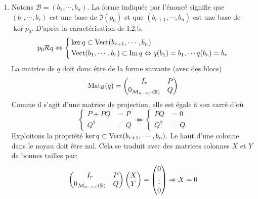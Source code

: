\begin{enumerate}
  \item Notons $\mathcal{B}=(b_1,\cdots,b_n)$. La forme indiquée par l'énoncé signifie que $(b_1,\cdots,b_r)$ est une base de $\Im(p_0)$ et que $(b_{r+1},\cdots, b_n)$ est une base de $\ker p_0$. D'après la caractérisation de I.2.b.
\begin{displaymath}
p_0 \mathcal{R} q \Leftrightarrow
\left\lbrace 
\begin{aligned}
  &\ker q \subset \operatorname{Vect}(b_{r+1},\cdots,b_n)\\ 
  &\operatorname{Vect}(b_1,\cdots,b_r) \subset \operatorname{Im} q \Leftrightarrow q(b_1)=b_1,\cdots q(b_r)=b_r
\end{aligned}
\right. 
\end{displaymath}
La matrice de $q$ doit donc être de la forme suivante (avec des blocs)
\begin{displaymath}
\operatorname{Mat}_{\mathcal{B}}(q)=
\begin{pmatrix}
  I_r & P \\ 0_{\mathcal{M}_{n-r,r}(\mathbb{R})} & Q
\end{pmatrix}
\end{displaymath}
Comme il s'agit d'une matrice de projection, elle est égale à son carré d'où
\begin{displaymath}
  \left\lbrace 
\begin{aligned}
P + PQ &= P \\ Q^2 &= Q  
\end{aligned}
\right. 
\Leftrightarrow
  \left\lbrace 
\begin{aligned}
PQ &= 0 \\ Q^2 &= Q  
\end{aligned}
\right. 
\end{displaymath}
Exploitons la propriété $\ker q \subset \operatorname{Vect}(b_{r+1},\cdots , b_n)$. Le haut d'une colonne dans le noyau doit être nul. Cela se traduit avec des matrices colonnes $X$ et $Y$ de bonnes tailles par:
\begin{displaymath}
\begin{pmatrix}
  I_r & P \\ 0_{\mathcal{M}_{n-r,r}(\mathbb{R})} & Q
\end{pmatrix}
\begin{pmatrix}
X \\ Y
\end{pmatrix}
=
\begin{pmatrix}
  0 \\ \vdots \\0
\end{pmatrix}
\Rightarrow X =0
\end{displaymath}

\end{enumerate}
